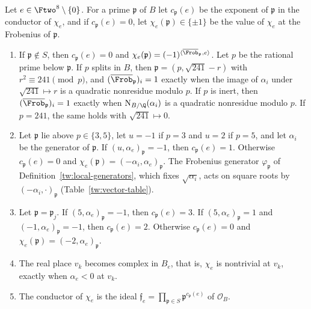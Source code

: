 \begin{proposition}\label{gf:local-data}
Let $e\in\Ftwo^8\setminus\{0\}$. For a prime $\mathfrak p$ of $B$ let
$c_{\mathfrak p}(e)$ be the exponent of $\mathfrak p$ in the conductor of
$\chi_e$, and if $c_{\mathfrak p}(e)=0$, let $\chi_e(\mathfrak p)\in\{\pm1\}$
be the value of $\chi_e$ at the Frobenius of $\mathfrak p$.
\begin{enumerate}
\item If $\mathfrak p\notin S$, then $c_{\mathfrak p}(e)=0$ and
 $\chi_e(\mathfrak p)=(-1)^{\langle\overline{\Frob}_{\mathfrak p},e\rangle}$.
 Let $p$ be the rational prime below $\mathfrak p$. If $p$ splits in $B$, then
 $\mathfrak p=(p,\sqrt{241}-r)$ with $r^2\equiv241\pmod p$, and
 $(\overline{\Frob}_{\mathfrak p})_i=1$ exactly when the image of $\alpha_i$
 under $\sqrt{241}\mapsto r$ is a quadratic nonresidue modulo $p$. If $p$ is
 inert, then $(\overline{\Frob}_{\mathfrak p})_i=1$ exactly when
 $\mathrm N_{B/\Q}(\alpha_i)$ is a quadratic nonresidue modulo $p$. If $p=241$, the
 same holds with $\sqrt{241}\mapsto0$.
\item Let $\mathfrak p$ lie above $p\in\{3,5\}$, let $u=-1$ if $p=3$ and $u=2$
 if $p=5$, and let $\alpha_i$ be the generator of $\mathfrak p$. If
 $(u,\alpha_e)_{\mathfrak p}=-1$, then $c_{\mathfrak p}(e)=1$. Otherwise
 $c_{\mathfrak p}(e)=0$ and
 $\chi_e(\mathfrak p)=(-\alpha_i,\alpha_e)_{\mathfrak p}$. The Frobenius
 generator $\varphi_{\mathfrak p}$ of Definition~\ref{tw:local-generators},
 which fixes $\sqrt{\alpha_i}$, acts on square roots by
 $(-\alpha_i,\cdot)_{\mathfrak p}$ (Table~\ref{tw:vector-table}).
\item Let $\mathfrak p=\mathfrak p_j$. If $(5,\alpha_e)_{\mathfrak p}=-1$, then
 $c_{\mathfrak p}(e)=3$. If $(5,\alpha_e)_{\mathfrak p}=1$ and
 $(-1,\alpha_e)_{\mathfrak p}=-1$, then $c_{\mathfrak p}(e)=2$. Otherwise
 $c_{\mathfrak p}(e)=0$ and $\chi_e(\mathfrak p)=(-2,\alpha_e)_{\mathfrak p}$.
\item The real place $v_k$ becomes complex in $B_e$, that is, $\chi_e$ is
 nontrivial at $v_k$, exactly when $\alpha_e<0$ at $v_k$.
\item The conductor of $\chi_e$ is the ideal
 $\mathfrak f_e=\prod_{\mathfrak p\in S}\mathfrak p^{c_{\mathfrak p}(e)}$ of
 $\mathcal O_B$.
\end{enumerate}
\end{proposition}


